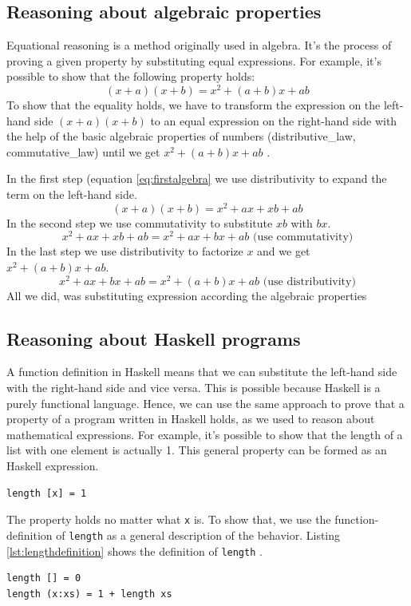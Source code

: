 \subsection{Reasoning about algebraic properties}

Equational reasoning is a method originally used in algebra. It's the process of proving a given property by substituting equal expressions.
For example, it's possible to show that the following property holds:
\begin{equation}
  \label{eq:sum}
  (x+a)(x+b) = x^2 + (a+b)x+ab
\end{equation}
To show that the equality holds, we have to transform the expression on the left-hand side  $(x+a)(x+b)$  to an equal expression on the right-hand side with the help of the basic algebraic properties of numbers (\gls{distributive_law}, \gls{commutative_law}) until we get $x^2 + (a+b)x+ab$  \cite{hutton}. 

In the first step (equation \ref{eq:firstalgebra} we use distributivity to expand the term on the left-hand side.
\begin{equation}
   (x+a)(x+b) = x^2 + ax + xb + ab
\end{equation}
In the second step we use commutativity to substitute $xb$ with $bx$.
\begin{equation}
x^2 + ax + xb + ab = x^2 + ax + bx + ab \text{     (use commutativity)}
\end{equation}
In the last step we use distributivity to factorize $x$ and we get $x^2 + (a+b)x+ab$.
\begin{equation}
x^2 + ax + bx + ab = x^2 + (a + b)x + ab \text{     (use distributivity)}
\end{equation}
All we did, was substituting expression according the algebraic properties 

\subsection{Reasoning about Haskell programs}

A function definition in Haskell means that we can substitute the left-hand side with the right-hand side and vice versa. This is possible because Haskell is a purely functional language. Hence, we can use the same approach to prove that a property of a program written in Haskell holds, as we used to reason about mathematical expressions. 
For example, it's possible to show that the length of a list with one element is actually 1. This general property can be formed as an Haskell expression. 
\begin{verbatim}
length [x] = 1
\end{verbatim}
The property holds no matter what \verb|x| is. To show that, we use the \gls{function-definition} of \verb|length| as a general description of the behavior. Listing \ref{lst:lengthdefinition} shows the definition of \verb|length| \cite{hutton}.
\begin{lstlisting}[caption={Function definition of {\ttfamily length}},label={lst:lengthdefinition}]
length [] = 0
length (x:xs) = 1 + length xs  
\end{lstlisting}

